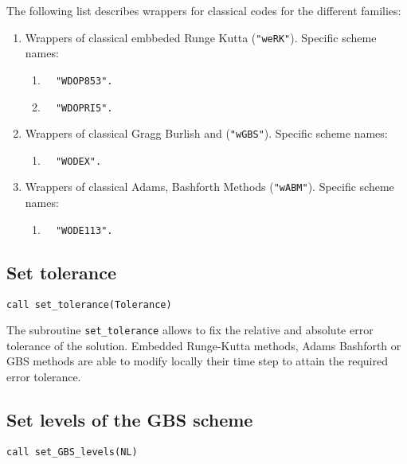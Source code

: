 \newpage
The following list describes wrappers for classical codes for the different families:  
 \begin{enumerate} 
     \setlength\itemsep{0cm}
    \item  Wrappers of classical embbeded Runge Kutta (\verb|"weRK"|). Specific scheme names:  
          \begin{enumerate} 
              \item  \verb|  "WDOP853".| 
              \item  \verb|  "WDOPRI5".|
            \end{enumerate}  
    \item  Wrappers of classical Gragg Burlish and (\verb|"wGBS"|). Specific scheme names: 
               \begin{enumerate} 
                  \item  \verb|  "WODEX". |   
               \end{enumerate}        
    \item  Wrappers of classical Adams, Bashforth Methods (\verb|"wABM"|). Specific scheme names: 
           \begin{enumerate} 
              \item  \verb|  "WODE113". |
            \end{enumerate}  
  \end{enumerate} 

\subsection*{Set tolerance}
\begin{lstlisting}[frame=trBL]
call set_tolerance(Tolerance) 
\end{lstlisting}   

The subroutine \verb|set_tolerance| allows to fix the relative and absolute error tolerance of the solution. Embedded Runge-Kutta methods, Adams Bashforth or GBS methods are able to modify locally their time step to attain the required error tolerance.  



\subsection*{Set levels of the GBS scheme}
\begin{lstlisting}[frame=trBL]
call set_GBS_levels(NL) 
\end{lstlisting}   

